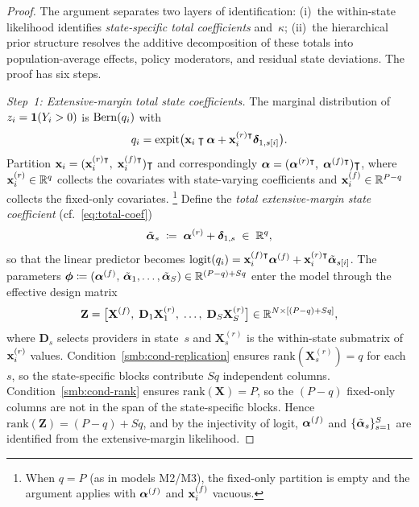 \begin{proof}
  The argument separates two layers of identification: (i)~the
  within-state likelihood identifies \emph{state-specific total
  coefficients} and~$\kappa$; (ii)~the hierarchical prior structure
  resolves the additive decomposition of these totals into
  population-average effects, policy moderators, and residual state
  deviations. The proof has six steps.

  \medskip\noindent\textit{Step~1: Extensive-margin total state
  coefficients.}\enspace
  The marginal distribution of $z_i = \mathbf{1}(Y_i > 0)$ is
  $\operatorname{Bern}(q_i)$ with
  \[
    q_i = \operatorname{expit}\bigl(\mathbf{x}_i\intercal\boldsymbol{\alpha}
      + \mathbf{x}_i^{(r)\intercal}\boldsymbol{\delta}_{1,s[i]}\bigr).
  \]
  Partition $\mathbf{x}_i = (\mathbf{x}_i^{(r)\intercal},\;\mathbf{x}_i^{(f)\intercal})\intercal$ and
  correspondingly $\boldsymbol{\alpha} = (\boldsymbol{\alpha}^{(r)\intercal},\;\boldsymbol{\alpha}^{(f)\intercal})\intercal$,
  where $\mathbf{x}_i^{(r)} \in \mathbb{R}^q$ collects the covariates with
  state-varying coefficients and $\mathbf{x}_i^{(f)} \in \mathbb{R}^{P-q}$ collects
  the fixed-only covariates.%
  \footnote{When $q = P$ (as in models M2/M3), the fixed-only
  partition is empty and the argument applies with $\boldsymbol{\alpha}^{(f)}$
  and $\mathbf{x}_i^{(f)}$ vacuous.}
  Define the \emph{total extensive-margin state coefficient}
  (cf.~\eqref{eq:total-coef})
  \begin{equation}\label{smb:eq-total-ext}
    \tilde{\boldsymbol{\alpha}}_s \;\coloneqq\; \boldsymbol{\alpha}^{(r)} + \boldsymbol{\delta}_{1,s}
    \;\in\; \mathbb{R}^q,
  \end{equation}
  so that the linear predictor becomes
  $\operatorname{logit}(q_i)
  = \mathbf{x}_i^{(f)\intercal}\boldsymbol{\alpha}^{(f)}
    + \mathbf{x}_i^{(r)\intercal}\tilde{\boldsymbol{\alpha}}_{s[i]}$.
  The parameters
  $\boldsymbol{\phi} \coloneqq (\boldsymbol{\alpha}^{(f)},\,
  \tilde{\boldsymbol{\alpha}}_1,\ldots,\tilde{\boldsymbol{\alpha}}_S)
  \in \mathbb{R}^{(P-q) + Sq}$ enter the model through the
  effective design matrix
  \[
    \mathbf{Z}
    = \bigl[\mathbf{X}^{(f)},\;
      \mathbf{D}_1\mathbf{X}_1^{(r)},\;\ldots,\;
      \mathbf{D}_S\mathbf{X}_S^{(r)}\bigr]
    \in \mathbb{R}^{N \times [(P-q) + Sq]},
  \]
  where $\mathbf{D}_s$ selects providers in state~$s$ and
  $\mathbf{X}_s^{(r)}$ is the within-state submatrix of
  $\mathbf{x}_i^{(r)}$ values. Condition~\ref{smb:cond-replication} ensures
  $\mathrm{rank}(\mathbf{X}_s^{(r)}) = q$ for each $s$, so the
  state-specific blocks contribute $Sq$ independent columns.
  Condition~\ref{smb:cond-rank} ensures
  $\mathrm{rank}(\mathbf{X}) = P$, so the $(P-q)$ fixed-only columns
  are not in the span of the state-specific blocks. Hence
  $\mathrm{rank}(\mathbf{Z}) = (P-q) + Sq$, and by the injectivity of
  logit, $\boldsymbol{\alpha}^{(f)}$ and
  $\{\tilde{\boldsymbol{\alpha}}_s\}_{s=1}^S$ are identified from the
  extensive-margin likelihood.


\end{proof}
